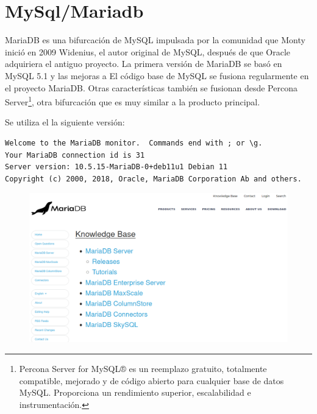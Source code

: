 \chapter*{MySql/Mariadb}
MariaDB es una bifurcación de MySQL impulsada por la comunidad que Monty inició en 2009 Widenius, el autor original de MySQL, después de que Oracle adquiriera el antiguo proyecto.
La primera versión de MariaDB se basó en MySQL 5.1 y las mejoras a El código base de MySQL se fusiona regularmente en el proyecto MariaDB. Otras características
también se fusionan desde Percona Server\footnote{Percona Server for MySQL® es un reemplazo gratuito, totalmente compatible, mejorado y de código abierto para cualquier base de datos MySQL. Proporciona un rendimiento superior, escalabilidad e instrumentación.}, otra bifurcación que es muy similar a la producto principal.

Se utiliza el la siguiente versión:
\begin{verbatim}
Welcome to the MariaDB monitor.  Commands end with ; or \g.
Your MariaDB connection id is 31
Server version: 10.5.15-MariaDB-0+deb11u1 Debian 11
Copyright (c) 2000, 2018, Oracle, MariaDB Corporation Ab and others.
\end{verbatim}

\begin{figure}[h]
\includegraphics[scale=0.5]{images/maria1}
\end{figure}

